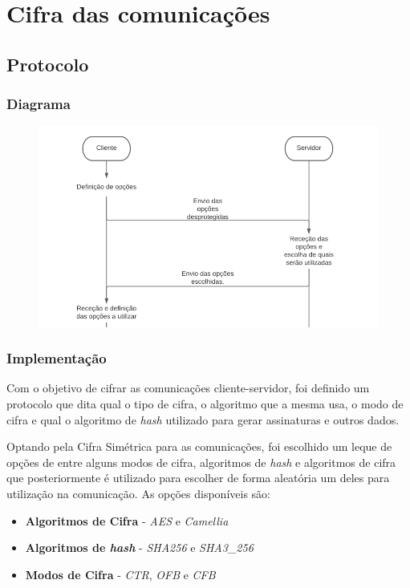 \documentclass[10pt,english]{article}
\begin{document}
\section{Cifra das comunicações}
\subsection{Protocolo}

\subsubsection{Diagrama}

\begin{figure}[!h]
        \centering
        \includegraphics[width=\textwidth]{images/1.png}
\end{figure}

\subsubsection{Implementação}
 \par Com o objetivo de cifrar as comunicações cliente-servidor, foi definido um protocolo que dita qual o tipo de cifra, o algoritmo que a mesma usa, o modo de cifra e qual o algoritmo de \textit{hash} utilizado para gerar assinaturas e outros dados.

\par Optando pela Cifra Simétrica para as comunicações, foi escolhido um leque de opções de entre alguns modos de cifra, algoritmos de \textit{hash} e algoritmos de cifra que posteriormente é utilizado para escolher de forma aleatória um deles para utilização na comunicação. As opções disponíveis são:

\begin{itemize}
    \item {\textbf{Algoritmos de Cifra}} - \textit{AES} e  \textit{Camellia}
   
   \item {\textbf{Algoritmos de \textit{hash}}} - \textit{SHA256} e \textit{SHA3\_256}
  
\item {\textbf{Modos de Cifra}} - \textit{CTR}, \textit{OFB} e \textit{CFB}
    
 \end{itemize}
 
\end{document}
